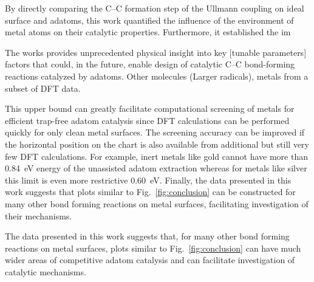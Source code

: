 \documentclass[journal=jacsat,manuscript=article]{achemso}
\newcommand{\comm}{\color{ForestGreen}} %
\begin{document}
{\comm 


By directly comparing the C--C formation step of the Ullmann coupling on ideal surface and adatoms, this work quantified the influence of the environment of metal atoms on their catalytic properties. Furthermore, it established the im

The works provides unprecedented physical insight into key [tunable parameters] factors that could, in the future, enable design of catalytic C--C bond-forming reactions catalyzed by adatoms. Other molecules (Larger radicals), metals from a subset of DFT data.

This upper bound can greatly facilitate computational screening of metals for efficient trap-free adatom catalysis since DFT calculations can be performed quickly for only clean metal surfaces. The screening accuracy can be improved if the horizontal position on the chart is also available from additional but still very few DFT calculations. For example, inert metals like gold cannot have more than \SI{0.84}{\electronvolt} energy of the unassisted adatom extraction whereas for metals like silver this limit is even more restrictive \SI{0.60}{\electronvolt}. Finally, the data presented in this work suggests that plots similar to Fig.~\ref{fig:conclusion} can be constructed for many other bond forming reactions on metal surfaces, facilitating investigation of their mechanisms. 

The data presented in this work suggests that, for many other bond forming reactions on metal surfaces, plots similar to Fig.~\ref{fig:conclusion} can have much wider areas of competitive adatom catalysis and can facilitate investigation of catalytic mechanisms. 

}

\end{document}
